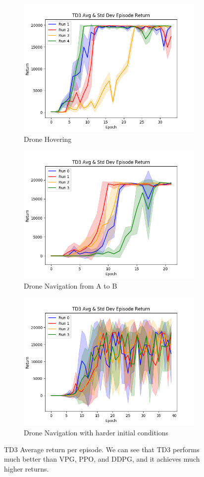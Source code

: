 \begin{figure}[H]
    \centering
     \begin{subfigure}[b]{\textwidth}
         \centering
             \includegraphics[width = .5\textwidth]{img/TD3_return_vanilla.png}
        \caption{Drone Hovering}
     \end{subfigure}
     \begin{subfigure}[b]{\textwidth}
         \centering
             \includegraphics[width = .5\textwidth]{img/TD3_return_moderate.png}
         \caption{Drone Navigation from A to B}
     \end{subfigure}
     \begin{subfigure}[b]{\textwidth}
         \centering
             \includegraphics[width = .5\textwidth]{img/TD3_return_extreme.png}
         \caption{Drone Navigation with harder initial conditions}
     \end{subfigure}
    \caption{TD3 Average return per episode. We can see that TD3 performs much better than VPG, PPO, and DDPG, and it achieves much higher returns.}
    \label{fig:td3}
\end{figure}

